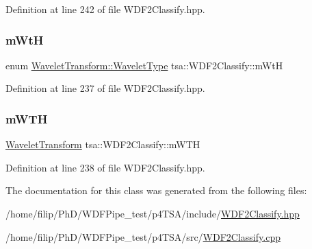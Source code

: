 Definition at line 242 of file W\+D\+F2\+Classify.\+hpp.

\mbox{\label{classtsa_1_1_w_d_f2_classify_af6eb80034fbf746a2b9518345616407e}} 
\subsubsection{\texorpdfstring{m\+WtH}{mWtH}}
{\footnotesize\ttfamily enum \hyperlink{classtsa_1_1_wavelet_transform_a5a529de70e0004333fcf23b9cca88ce7}{Wavelet\+Transform\+::\+Wavelet\+Type} tsa\+::\+W\+D\+F2\+Classify\+::m\+WtH\hspace{0.3cm}{\ttfamily [private]}}



Definition at line 237 of file W\+D\+F2\+Classify.\+hpp.

\mbox{\label{classtsa_1_1_w_d_f2_classify_a57dc2b30913652447a8abd4c1ac7fb0f}} 
\subsubsection{\texorpdfstring{m\+W\+TH}{mWTH}}
{\footnotesize\ttfamily \hyperlink{classtsa_1_1_wavelet_transform}{Wavelet\+Transform} tsa\+::\+W\+D\+F2\+Classify\+::m\+W\+TH\hspace{0.3cm}{\ttfamily [private]}}



Definition at line 238 of file W\+D\+F2\+Classify.\+hpp.



The documentation for this class was generated from the following files\+:\begin{DoxyCompactItemize}
\item 
/home/filip/\+Ph\+D/\+W\+D\+F\+Pipe\+\_\+test/p4\+T\+S\+A/include/\hyperlink{_w_d_f2_classify_8hpp}{W\+D\+F2\+Classify.\+hpp}\item 
/home/filip/\+Ph\+D/\+W\+D\+F\+Pipe\+\_\+test/p4\+T\+S\+A/src/\hyperlink{_w_d_f2_classify_8cpp}{W\+D\+F2\+Classify.\+cpp}\end{DoxyCompactItemize}
